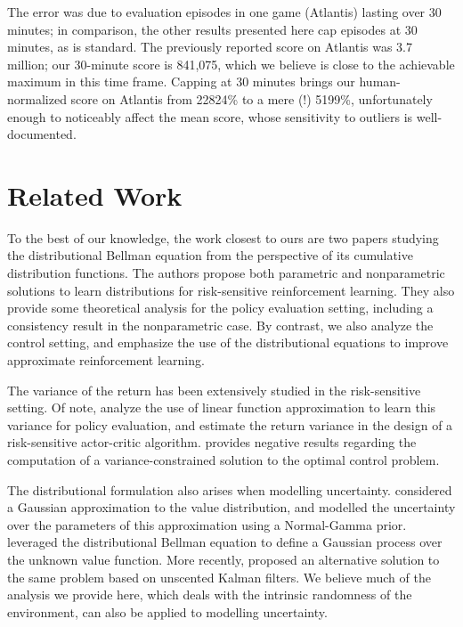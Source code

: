\documentclass{article}
\begin{document}
The error was due to evaluation episodes in one game (Atlantis) lasting over 30 minutes; in comparison, the other results presented here cap episodes at 30 minutes, as is standard. The previously reported score on Atlantis was 3.7 million; our 30-minute score is 841,075, which we believe is close to the achievable maximum in this time frame. Capping at 30 minutes brings our human-normalized score on Atlantis from 22824\% to a mere (!) 5199\%, unfortunately enough to noticeably affect the mean score, whose sensitivity to outliers is well-documented. 


\begin{small}


\end{small}

\clearpage
\newpage

\appendix

\section{Related Work}

To the best of our knowledge, the work closest to ours are two papers \citep{morimura2010nonparametric,morimura10parametric} studying the distributional Bellman equation from the perspective of its cumulative distribution functions. The authors propose both parametric and nonparametric solutions to learn distributions for risk-sensitive reinforcement learning. They also provide some theoretical analysis for the policy evaluation setting, including a consistency result in the nonparametric case. By contrast, we also analyze the control setting, and emphasize the use of the distributional equations to improve approximate reinforcement learning.

The variance of the return has been extensively studied in the risk-sensitive setting. Of note, \citet{tamar2016learning} analyze the use of linear function approximation to learn this variance for policy evaluation, and \citet{prashanth13actorcritic} estimate the return variance in the design of a risk-sensitive actor-critic algorithm. \citet{mannor11meanvariance} provides negative results regarding the computation of a variance-constrained solution to the optimal control problem.

The distributional formulation also arises when modelling uncertainty. \citet{dearden98bayesian} considered a Gaussian approximation to the value distribution, and modelled the uncertainty over the parameters of this approximation using a Normal-Gamma prior. \citet{engel05reinforcement} leveraged the distributional Bellman equation to define a Gaussian process over the unknown value function. More recently, \citet{geist10kalman} proposed an alternative solution to the same problem based on unscented Kalman filters. We believe much of the analysis we provide here, which deals with the intrinsic randomness of the environment, can also be applied to modelling uncertainty.
\end{document}

